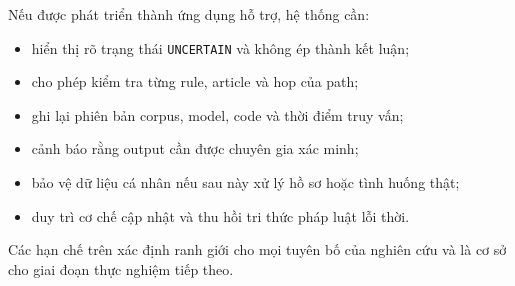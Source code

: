Nếu được phát triển thành ứng dụng hỗ trợ, hệ thống cần:

\begin{itemize}
    \item hiển thị rõ trạng thái \texttt{UNCERTAIN} và không ép thành kết luận;
    \item cho phép kiểm tra từng rule, article và hop của path;
    \item ghi lại phiên bản corpus, model, code và thời điểm truy vấn;
    \item cảnh báo rằng output cần được chuyên gia xác minh;
    \item bảo vệ dữ liệu cá nhân nếu sau này xử lý hồ sơ hoặc tình huống thật;
    \item duy trì cơ chế cập nhật và thu hồi tri thức pháp luật lỗi thời.
\end{itemize}

Các hạn chế trên xác định ranh giới cho mọi tuyên bố của nghiên cứu và là cơ
sở cho giai đoạn thực nghiệm tiếp theo.